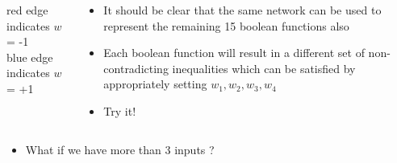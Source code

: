 \documentclass[serif, aspectratio=169]{beamer}
\begin{document}
\begin{frame}
\begin{columns}
\begin{overlayarea}{\textwidth}{\textheight}
red edge indicates $w$ = -1 \\
blue edge indicates $w$ = +1


\end{overlayarea}

\begin{overlayarea}{\textwidth}{\textheight}

\begin{itemize}\justifying
\item<1-> It should be clear that the same network can be used to represent the remaining 15 boolean functions also
\item<2-> Each boolean function will result in a different set of non-contradicting inequalities which can be satisfied by appropriately setting $w_1, w_2, w_3, w_4$
\item<3-> Try it!
\end{itemize}

\end{overlayarea}
\end{columns}

\end{frame}

\begin{frame}
\begin{itemize}\justifying
\item<1-> What if we have more than 3 inputs ?
\end{itemize}
\end{frame}
\end{document}
